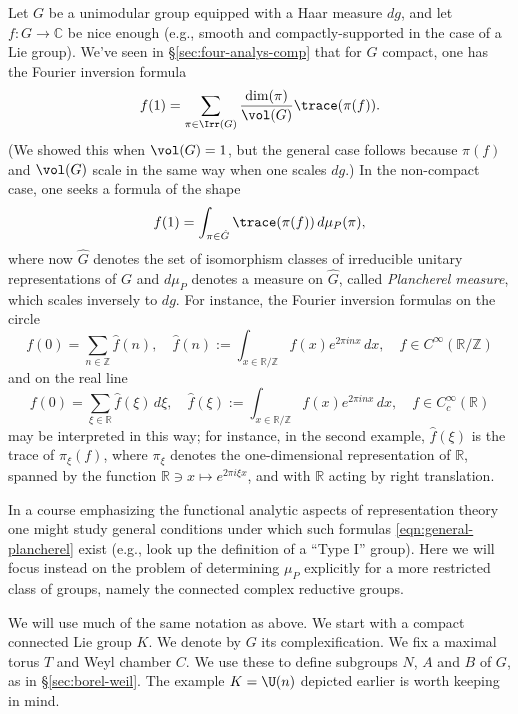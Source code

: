 \documentclass[reqno]{amsart} 
\begin{document}
Let $G$ be a unimodular group equipped with a Haar measure $d g$, and let $f : G \rightarrow \mathbb{C}$ be nice enough (e.g., smooth and compactly-supported in the case of a Lie group).  We've seen in \S\ref{sec:four-analys-comp} that for $G$ compact, one has the Fourier inversion formula
\begin{equation*}
  f(1)
  =
  \sum_{\pi \in \Irr(G)}
  \frac{\dim(\pi)}{\vol(G)}
  \trace(\pi(f)).
\end{equation*}
(We showed this when $\vol(G) = 1$, but the general case follows because $\pi(f)$ and $\vol(G)$ scale in the same way when one scales $d g$.)  In the non-compact case, one seeks a formula of the shape
\begin{equation}\label{eqn:general-plancherel}
  f(1)
  = \int_{\pi \in \hat{G}}
  \trace(\pi(f))
  \, d \mu_P(\pi),
\end{equation}
where now $\hat{G}$ denotes the set of isomorphism classes of irreducible unitary representations of $G$ and $d \mu_P$ denotes a measure on $\hat{G}$, called \emph{Plancherel measure}, which scales inversely to $d g$.  For instance, the Fourier inversion formulas on the circle
\begin{equation*}
  f(0)
  = \sum_{n \in \mathbb{Z}}
  \hat{f}(n),
  \quad
  \hat{f}(n) := \int_{x \in \mathbb{R}/\mathbb{Z}}
  f(x) e^{2 \pi i n x} \, d x,
  \quad
  f \in C^\infty(\mathbb{R}/\mathbb{Z})
\end{equation*}
and on the real line
\begin{equation*}
  f(0)
  = \sum_{\xi \in \mathbb{R}}
  \hat{f}(\xi)
  \, d \xi,
  \quad
  \hat{f}(\xi) := \int_{x \in \mathbb{R}/\mathbb{Z}}
  f(x) e^{2 \pi i n x} \, d x,
  \quad
  f \in C_c^\infty(\mathbb{R})
\end{equation*}
may be interpreted in this way; for instance, in the second example, $\hat{f}(\xi)$ is the trace of $\pi_\xi(f)$, where $\pi_\xi$ denotes the one-dimensional representation of $\mathbb{R}$, spanned by the function $\mathbb{R} \ni x \mapsto e^{2 \pi i \xi x}$, and with $\mathbb{R}$ acting by right translation.

In a course emphasizing the functional analytic aspects of representation theory one might study general conditions under which such formulas \eqref{eqn:general-plancherel} exist (e.g., look up the definition of a ``Type I'' group).  Here we will focus instead on the problem of determining $\mu_P$ explicitly for a more restricted class of groups, namely the connected complex reductive groups.

We will use much of the same notation as above.  We start with a compact connected Lie group $K$.  We denote by $G$ its complexification.  We fix a maximal torus $T$ and Weyl chamber $C$.  We use these to define subgroups $N$, $A$ and $B$ of $G$, as in \S\ref{sec:borel-weil}.  The example $K = \U(n)$ depicted earlier is worth keeping in mind.
\end{document}
